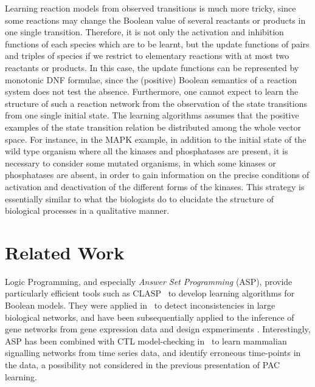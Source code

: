 \documentclass{llncs}
\begin{document}
  Learning reaction models from observed transitions is much more tricky,
  since some reactions may change the Boolean value of several reactants or products in one single transition.
  Therefore, it is not only the activation and inhibition functions of each species which are to be learnt,
  but the update functions of pairs and triples of species if we restrict to elementary reactions with at most two reactants or products.
  In this case, the update functions can be represented by monotonic DNF formulae, since the (positive) Boolean semantics of a reaction system does not test the absence.
Furthermore,   one cannot expect to learn the structure of such a reaction network
from the observation of the state transitions from one single initial state.
The learning algorithms assumes that the positive examples of the state transition relation be distributed
among the whole vector space.
For instance, in the MAPK example, in addition to the initial state of the wild type organism where all the kinases and phosphatases are present,
it is necessary to consider some mutated organisms, in which some kinases or phosphatases are absent,
in order to gain information on the precise conditions of activation and deactivation of the different forms of the kinases.
This strategy is essentially similar to what the biologists do to elucidate the structure of biological processes
in a qualitative manner.


\section{Related Work}

Logic Programming, and especially \emph{Answer Set Programming} (ASP), provide particularly efficient tools such as CLASP~\cite{GKNS07lpnmr} to develop learning algorithms for Boolean models.
They were applied in~\cite{GSTUV08iclp} to detect inconsistencies in large biological networks,
and have been subsequentially applied to the inference of gene networks from gene expression data and design expmeriments \cite{VKASSSG15frontiers}.
Interestingly, ASP has been combined with CTL model-checking in~\cite{OPSSG16biosystems} to learn mammalian signalling networks from time series data,
and identify erroneous time-points in the data, a possibility not considered in the previous presentation of PAC learning.
\end{document}
